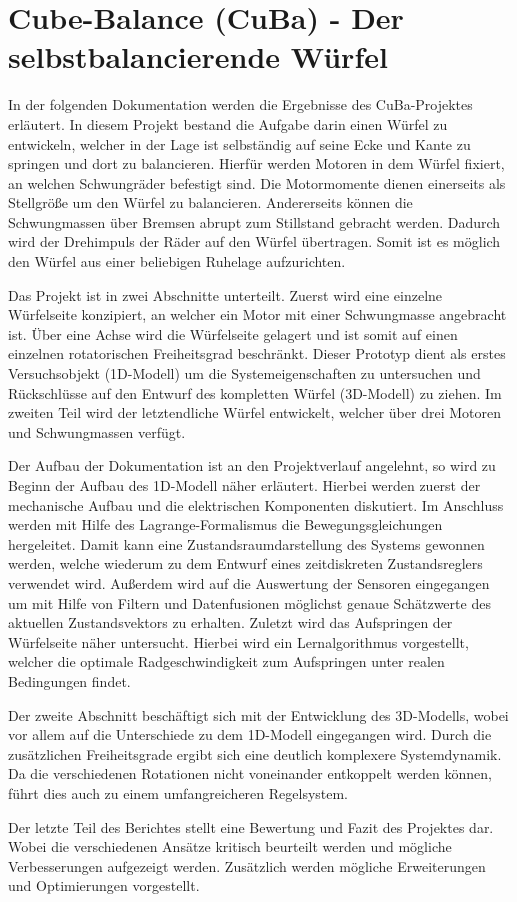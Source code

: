 \section{Cube-Balance (CuBa) - Der selbstbalancierende Würfel}
In der folgenden Dokumentation werden die Ergebnisse des CuBa-Projektes erläutert. In diesem Projekt bestand die Aufgabe darin einen Würfel zu entwickeln, welcher in der Lage ist selbständig auf seine Ecke und Kante zu springen und dort zu balancieren. Hierfür werden Motoren in dem Würfel fixiert, an welchen Schwungräder befestigt sind. Die Motormomente dienen einerseits als Stellgröße um den Würfel zu balancieren. Andererseits können die Schwungmassen über Bremsen abrupt zum Stillstand gebracht werden. Dadurch wird der Drehimpuls der Räder auf den Würfel übertragen. Somit ist es möglich den Würfel aus einer beliebigen Ruhelage aufzurichten.
\newline

Das Projekt ist in zwei Abschnitte unterteilt. Zuerst wird eine einzelne Würfelseite konzipiert, an welcher ein Motor mit einer Schwungmasse angebracht ist. Über eine Achse wird die Würfelseite gelagert und ist somit auf einen einzelnen rotatorischen Freiheitsgrad beschränkt. Dieser Prototyp dient als erstes Versuchsobjekt (1D-Modell) um die Systemeigenschaften zu untersuchen und Rückschlüsse auf den Entwurf des kompletten Würfel (3D-Modell) zu ziehen. Im zweiten Teil wird der letztendliche Würfel entwickelt, welcher über drei Motoren und Schwungmassen verfügt.
\newline

Der Aufbau der Dokumentation ist an den Projektverlauf angelehnt, so wird zu Beginn der Aufbau des 1D-Modell näher erläutert. Hierbei werden zuerst der mechanische Aufbau und die elektrischen Komponenten diskutiert. Im Anschluss werden mit Hilfe des Lagrange-Formalismus die Bewegungsgleichungen hergeleitet. Damit kann eine Zustandsraumdarstellung des Systems gewonnen werden, welche wiederum zu dem Entwurf eines zeitdiskreten Zustandsreglers verwendet wird. Außerdem wird auf die Auswertung der Sensoren eingegangen um mit Hilfe von Filtern und Datenfusionen möglichst genaue Schätzwerte des aktuellen Zustandsvektors zu erhalten. Zuletzt wird das Aufspringen der Würfelseite näher untersucht. Hierbei wird ein Lernalgorithmus vorgestellt, welcher die optimale Radgeschwindigkeit zum Aufspringen unter realen Bedingungen findet.
\newline

Der zweite Abschnitt beschäftigt sich mit der Entwicklung des 3D-Modells, wobei vor allem auf die Unterschiede zu dem 1D-Modell eingegangen wird. Durch die zusätzlichen Freiheitsgrade ergibt sich eine deutlich komplexere Systemdynamik. Da die verschiedenen Rotationen nicht voneinander entkoppelt werden können, führt dies auch zu einem umfangreicheren Regelsystem. 

Der letzte Teil des Berichtes stellt eine Bewertung und Fazit des Projektes dar. Wobei die verschiedenen Ansätze kritisch beurteilt werden und mögliche Verbesserungen aufgezeigt werden. Zusätzlich werden mögliche Erweiterungen und Optimierungen vorgestellt.

